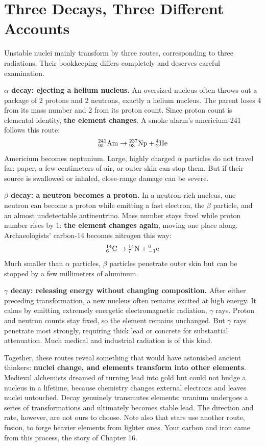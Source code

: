 \section{Three Decays, Three Different Accounts}

Unstable nuclei mainly transform by three routes, corresponding to three radiations. Their bookkeeping differs completely and deserves careful examination.

\textbf{$\alpha$ decay: ejecting a helium nucleus.} An oversized nucleus often throws out a package of 2 protons and 2 neutrons, exactly a helium nucleus. The parent loses 4 from its mass number and 2 from its proton count. Since proton count is elemental identity, \textbf{the element changes}. A smoke alarm's americium-241 follows this route:
\[{}^{241}_{95}\mathrm{Am} \rightarrow {}^{237}_{93}\mathrm{Np} + {}^{4}_{2}\mathrm{He}\]
Americium becomes neptunium. Large, highly charged $\alpha$ particles do not travel far: paper, a few centimeters of air, or outer skin can stop them. But if their source is swallowed or inhaled, close-range damage can be severe.

\textbf{$\beta$ decay: a neutron becomes a proton.} In a neutron-rich nucleus, one neutron can become a proton while emitting a fast electron, the $\beta$ particle, and an almost undetectable antineutrino. Mass number stays fixed while proton number rises by 1: \textbf{the element changes again}, moving one place along. Archaeologists' carbon-14 becomes nitrogen this way:
\[{}^{14}_{6}\mathrm{C} \rightarrow {}^{14}_{7}\mathrm{N} + {}^{0}_{-1}\mathrm{e}\]
Much smaller than $\alpha$ particles, $\beta$ particles penetrate outer skin but can be stopped by a few millimeters of aluminum.

\textbf{$\gamma$ decay: releasing energy without changing composition.} After either preceding transformation, a new nucleus often remains excited at high energy. It calms by emitting extremely energetic electromagnetic radiation, $\gamma$ rays. Proton and neutron counts stay fixed, so the element remains unchanged. But $\gamma$ rays penetrate most strongly, requiring thick lead or concrete for substantial attenuation. Much medical and industrial radiation is of this kind.

Together, these routes reveal something that would have astonished ancient thinkers: \textbf{nuclei change, and elements transform into other elements}. Medieval alchemists dreamed of turning lead into gold but could not budge a nucleus in a lifetime, because chemistry changes external electrons and leaves nuclei untouched. Decay genuinely transmutes elements: uranium undergoes a series of transformations and ultimately becomes stable lead. The direction and rate, however, are not ours to choose. Note also that stars use another route, fusion, to forge heavier elements from lighter ones. Your carbon and iron came from this process, the story of Chapter 16.

